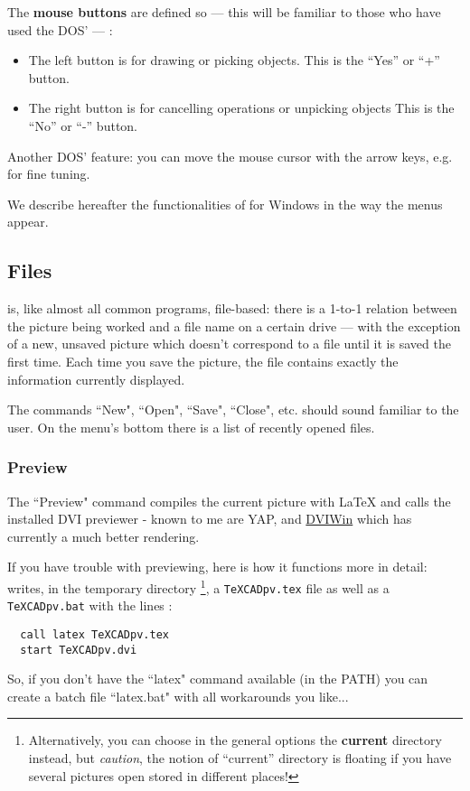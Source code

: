 \documentclass[11pt,a4paper]{article}
\begin{document}
The {\bf mouse buttons} are defined so --- this will be familiar to those who have used the DOS' {\TC} --- :
\begin{itemize}
\item The left button is for drawing or picking objects.
This is the ``Yes'' or ``+'' button.
\item The right button is for cancelling operations or unpicking objects
This is the ``No'' or ``-'' button.
\end{itemize}

Another DOS' {\TC} feature: you can move the mouse cursor with the arrow keys, e.g. for fine tuning.

We describe hereafter the functionalities of {\TC} for Windows in the
way the menus appear.
%
\subsection{Files}
{\TC} is, like almost all common programs, file-based: there is
a 1-to-1 relation between the picture being worked and a file name
on a certain drive --- with the exception of a new, unsaved
picture which doesn't correspond to a file until it is saved the first
time. Each time you save the picture, the file contains exactly
the information currently displayed.

The commands ``New", ``Open", ``Save", ``Close", etc. should sound
familiar to the user. On the menu's bottom there is a list of recently
opened files.

\subsubsection{Preview}
The ``Preview" command compiles the current picture with LaTeX and
calls the installed DVI previewer - known to me are YAP, and
\href{http://dviwin.keystone.gr/}{DVIWin}
which has currently a much better rendering.

If you have trouble with previewing, here is how it
functions more in detail: {\TC} writes,
in the temporary directory \footnote{Alternatively, you can choose in
the general options the {\bf current} directory instead, but {\it caution}, the
notion of ``current'' directory is floating if you have several pictures
open stored in different places!},
a {\tt TeXCADpv.tex} file
as well as a {\tt TeXCADpv.bat} with the lines :
\begin{verbatim}
  call latex TeXCADpv.tex
  start TeXCADpv.dvi
\end{verbatim}
So, if you don't have the ``latex" command available (in the PATH) you
can create a batch file ``latex.bat" with all workarounds you like...
\end{document}
